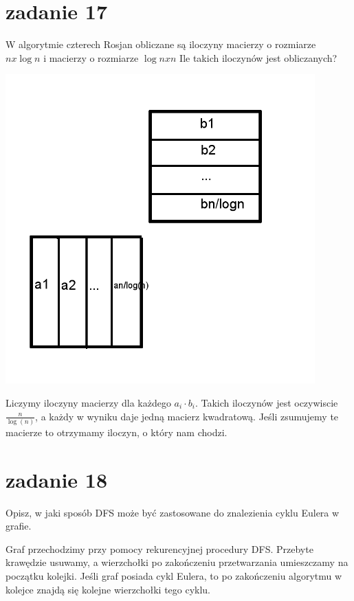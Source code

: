 \section{zadanie 17}
\begin{framed}
W algorytmie czterech Rosjan obliczane są iloczyny macierzy o rozmiarze $ n x \log n$ i macierzy o rozmiarze $ \log n x n$ Ile takich iloczynów jest obliczanych?
\end{framed}

\includegraphics[scale=0.55]{images/17.png}

Liczymy iloczyny macierzy dla każdego $a_i \cdot b_i$. Takich iloczynów jest oczywiscie $\frac{n}{\log(n)}$, 
a każdy w wyniku daje jedną macierz kwadratową. Jeśli zsumujemy te macierze to otrzymamy iloczyn, o który nam chodzi.

\section{zadanie 18}
\begin{framed}
Opisz, w jaki sposób DFS może być zastosowane do znalezienia cyklu Eulera w grafie.
\end{framed}

Graf przechodzimy przy pomocy rekurencyjnej procedury DFS. Przebyte krawędzie usuwamy, a wierzchołki po zakończeniu przetwarzania umieszczamy na początku kolejki. Jeśli graf posiada cykl Eulera, to po zakończeniu algorytmu w kolejce znajdą się kolejne wierzchołki tego cyklu.

